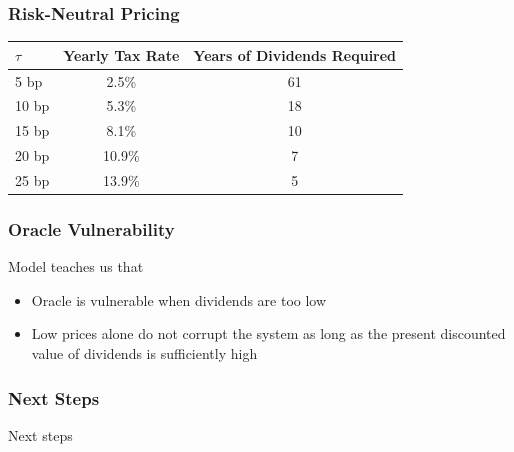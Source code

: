 \documentclass[10pt]{beamer}
\begin{document}
\begin{frame} \frametitle{Risk-Neutral Pricing}
  \begin{center}
    \begin{tabular}{l|cc}
      $\tau$ & Yearly Tax Rate & Years of Dividends Required \\
      \hline
      5 bp & 2.5\% & 61 \\
      10 bp & 5.3\% & 18 \\
      15 bp & 8.1\% & 10 \\
      20 bp & 10.9\% & 7 \\
      25 bp & 13.9\% & 5 \\
    \end{tabular}
  \end{center}
\end{frame}

\begin{frame} \frametitle{Oracle Vulnerability}

  Model teaches us that

  \begin{itemize}
    \item \alert{Oracle is vulnerable when dividends are too low}
    \item Low prices alone do \alert{not} corrupt the system as long as the present
          discounted value of dividends is sufficiently high
  \end{itemize}

\end{frame}

\begin{frame} \frametitle{Next Steps}
  Next steps
\end{frame}
\end{document}

